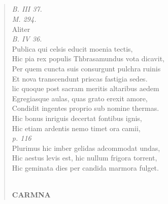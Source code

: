 \documentclass[11pt, a4paper]{report}
\begin{document}
            \subsection*{}
      \begin{verse}
      \textit{B. III 37.} \\ \textit{M. 294.} \\ Aliter \\ \textit{B. IV 36.} \\ Publica qui celsis educit moenia tectis, \\ Hic pia rex populis Thbrasamundus vota dicavit, \\ Per quem cuncta suis consurgunt pulchra ruinis \\ Et nova transcendunt priscas fastigia sedes. \\ lic quoque post sacram meritis altaribus aedem \\ Egregiasque aulas, quas grato erexit amore, \\ Condidit ingentes proprio sub nomine thermas. \\ Hic bonus inriguis decertat fontibus ignis, \\ Hic etiam ardentis  \lbrack nemo timet ora camii, \\ \textit{p. 116} \\ Plurimus hic imber gelidas adcommodat undas, \\ Hic aestus levis est, hic nullum frigora torrent, \\ Hic geminata dies per candida marmora fulget. \\ 
        ﻿\pagebreak 
     \marginpar{[182]} \begin{center} \textbf{CARMNA} \end{center}
      \end{verse}
  
\end{document}
